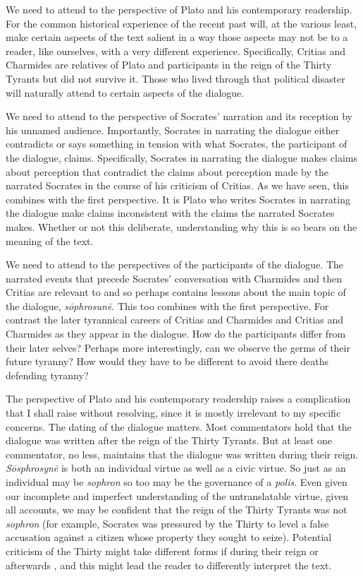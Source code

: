 We need to attend to the perspective of Plato and his contemporary readership. For the common historical experience of the recent past will, at the various least, make certain aspects of the text salient in a way those aspects may not be to a reader, like ourselves, with a very different experience. Specifically, Critias and Charmides are relatives of Plato and participants in the reign of the Thirty Tyrants but did not survive it. Those who lived through that political disaster will naturally attend to certain aspects of the dialogue.

We need to attend to the perspective of Socrates' narration and its reception by his unnamed audience. Importantly, Socrates in narrating the dialogue either contradicts or says something in tension with what Socrates, the participant of the dialogue, claims. Specifically, Socrates in narrating the dialogue makes claims about perception that contradict the claims about perception made by the narrated Socrates in the course of his criticism of Critias. As we have seen, this combines with the first perspective. It is Plato who writes Socrates in narrating the dialogue make claims inconsistent with the claims the narrated Socrates makes. Whether or not this deliberate, understanding why this is so bears on the meaning of the text. 

We need to attend to the perspectives of the participants of the dialogue. The narrated events that precede Socrates' conversation with Charmides and then Critias are relevant to and so perhaps contains lessons about the main topic of the dialogue, \emph{sōphrosunē}. This too combines with the first perspective. For contrast the later tyrannical careers of Critias and Charmides and Critias and Charmides as they appear in the dialogue. How do the participants differ from their later selves? Perhaps more interestingly, can we observe the germs of their future tyranny? How would they have to be different to avoid there deaths defending tyranny?

The perspective of Plato and his contemporary readership raises a complication that I shall raise without resolving, since it is mostly irrelevant to my specific concerns. The dating of the dialogue matters. Most commentators hold that the dialogue was written after the reign of the Thirty Tyrants. But at least one commentator, \citet[108–9]{Schleiermarcher:1836aa} no less, maintains that the dialogue was written during their reign. \emph{Sōsphrosynē} is both an individual virtue as well as a civic virtue. So just as an individual may be \emph{sophron} so too may be the governance of a \emph{polis}. Even given our incomplete and imperfect understanding of the untranslatable virtue, given all accounts, we may be confident that the reign of the Thirty Tyrants was not \emph{sophron} (for example, Socrates was pressured by the Thirty to level a false accusation against a citizen whose property they sought to seize). Potential criticism of the Thirty might take different forms if during their reign or afterwards \citep[42]{Hyland:1981aa}, and this might lead the reader to differently interpret the text.

